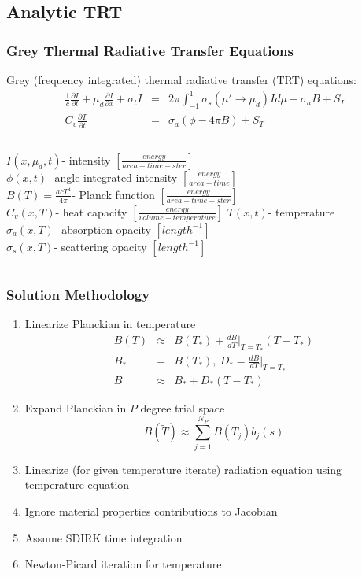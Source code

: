 \documentclass{beamer}
\newcommand{\be}{\begin{equation*}}   %
\newcommand{\ee}{\end{equation*}}
\newcommand{\bea}{\begin{eqnarray*}}  %
\newcommand{\eea}{\end{eqnarray*}}
\newcommand{\B}[1]{\ensuremath{b_{#1} }}			%
\newcommand{\p}{\ensuremath{ \partial}}			%
\begin{document}
\subsection{Analytic TRT}
\begin{frame}
\frametitle{Grey Thermal Radiative Transfer Equations}
Grey (frequency integrated) thermal radiative transfer (TRT) equations:
\bea
\frac{1}{c} \frac{\partial I}{\p t} + \mu_d \frac{\p I}{\p x}  + \sigma_t I &=&  2\pi \int_{-1}^{1}{ \sigma_s(\mu'\to\mu_d) I  d\mu }+ \sigma_a B + S_I\\
C_v \frac{\p T}{\p t} &=&   \sigma_a \left( \phi- 4\pi B   \right) + S_T
\eea
\begin{columns}[t]
\footnotesize
$I(x,\mu_d,t)$- intensity $\left[ \frac{energy}{area-time-ster} \right]$ \\
$\phi(x,t)$- angle integrated intensity $\left[ \frac{energy}{area-time} \right]$ \\
$B(T) = \frac{acT^4}{4\pi}$- Planck function $\left[ \frac{energy}{area-time-ster} \right]$ \\
$C_v(x,T)$- heat capacity $\left[ \frac{energy}{volume-temperature} \right] $
\footnotesize
$T(x,t)$- temperature \\
$\sigma_{a}(x,T)$- absorption opacity  $\left[ {length}^{-1} \right]$ \\
$\sigma_{s}(x,T)$- scattering opacity  $\left[ {length}^{-1} \right]$ 
\end{columns}
\end{frame}


\begin{frame}
\frametitle{Solution Methodology}
\begin{enumerate}
\item Linearize Planckian in temperature
\small
\bea
B(T) &\approx& B(T_*) + \frac{d B}{d T} \bigg \lvert_{T=T_*} (T - T_*)\\
B_*& =& B(T_*),~D_* = \frac{d B}{d T} \bigg \lvert_{T=T_*} \\
B &\approx& B_* + D_*(T-T_*)
\eea
\normalsize
\item Expand Planckian in $P$ degree trial space
\small
\be
B(\widetilde{T}) \approx \sum_{j=1}^{N_P}{ B(T_j) \B{j}(s) }
\ee
\normalsize
\item Linearize (for given temperature iterate) radiation equation using temperature equation 
\item Ignore material properties contributions to Jacobian
\item Assume SDIRK time integration
\item Newton-Picard iteration for temperature
\end{enumerate}
\end{frame}
\end{document}
